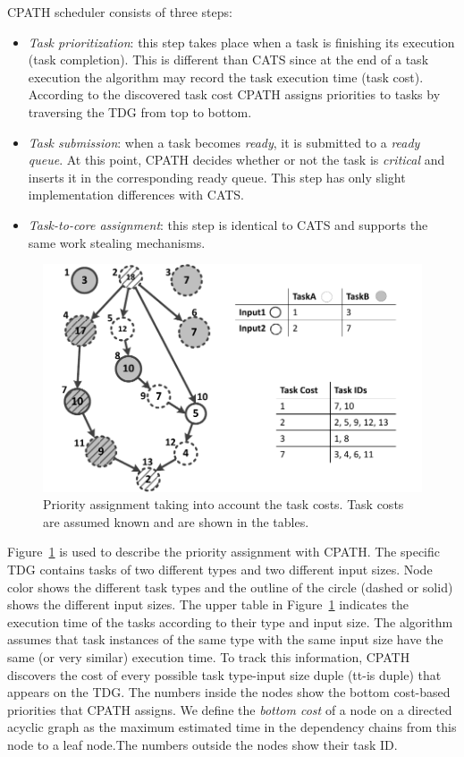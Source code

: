 CPATH scheduler consists of three steps:
\begin{itemize}

\item \textit{Task prioritization}: this step takes place when a task is finishing its execution (task completion). This is different than CATS since at the end of a task execution the algorithm may record the task execution time (task cost).
According to the discovered task cost CPATH assigns priorities to tasks by traversing the TDG from top to bottom.

 \item{\textit{Task submission}: when a task becomes \textit{ready}, it is submitted to a \textit{ready queue}. At this point, CPATH decides whether or not the task is \textit{critical} and inserts it in the corresponding ready queue. This step has only slight implementation differences with CATS.}

 \item{\textit{Task-to-core assignment}: this step is identical to CATS and supports the same work stealing mechanisms.}
\end{itemize}
\begin{figure}[tr]
\includegraphics[width=0.6\columnwidth]{Figs/cpath_priorities.pdf} 
\centering
\caption{Priority assignment taking into account the task costs. Task costs are assumed known and are shown in the tables.}
\label{cpath}
\vspace{-0.5cm}
\end{figure}
Figure~\ref{cpath} is used to describe the priority assignment with CPATH.
The specific TDG contains tasks of two different types and two different input sizes.
Node color shows the different task types and the outline of the circle (dashed or solid) shows the different input sizes.
The upper table in Figure~\ref{cpath} indicates the execution time of the tasks according to their type and input size.
The algorithm assumes that task instances of the same type with the same input size have the same (or very similar) execution time.
To track this information, CPATH discovers the cost of every possible task type-input size duple (tt-is duple) that appears on the TDG.
The numbers inside the nodes show the bottom cost-based priorities that CPATH assigns. We define the \textit{bottom cost} of a node on a directed acyclic graph as the maximum estimated time in the dependency chains from this node to a leaf node.The numbers outside the nodes show their task ID.


